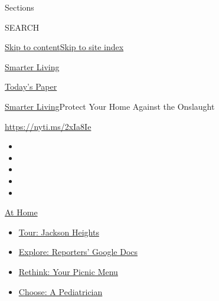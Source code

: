 Sections

SEARCH

\protect\hyperlink{site-content}{Skip to
content}\protect\hyperlink{site-index}{Skip to site index}

\href{https://www.nytimes3xbfgragh.onion/section/smarter-living}{Smarter
Living}

\href{https://myaccount.nytimes3xbfgragh.onion/auth/login?response_type=cookie\&client_id=vi}{}

\href{https://www.nytimes3xbfgragh.onion/section/todayspaper}{Today's
Paper}

\href{/section/smarter-living}{Smarter Living}\textbar{}Protect Your
Home Against the Onslaught

\url{https://nyti.ms/2xIa8Ie}

\begin{itemize}
\item
\item
\item
\item
\item
\end{itemize}

\href{https://www.nytimes3xbfgragh.onion/spotlight/at-home?action=click\&pgtype=Article\&state=default\&region=TOP_BANNER\&context=at_home_menu}{At
Home}

\begin{itemize}
\tightlist
\item
  \href{https://www.nytimes3xbfgragh.onion/interactive/2020/08/27/arts/design/jackson-heights-queens-virtual-walk-tour.html?action=click\&pgtype=Article\&state=default\&region=TOP_BANNER\&context=at_home_menu}{Tour:
  Jackson Heights}
\item
  \href{https://www.nytimes3xbfgragh.onion/interactive/2020/at-home/even-more-reporters-editors-diaries-lists-recommendations.html?action=click\&pgtype=Article\&state=default\&region=TOP_BANNER\&context=at_home_menu}{Explore:
  Reporters' Google Docs}
\item
  \href{https://www.nytimes3xbfgragh.onion/2020/08/31/dining/hand-held-picnic-food.html?action=click\&pgtype=Article\&state=default\&region=TOP_BANNER\&context=at_home_menu}{Rethink:
  Your Picnic Menu}
\item
  \href{https://www.nytimes3xbfgragh.onion/article/choosing-a-pediatrician-children.html?action=click\&pgtype=Article\&state=default\&region=TOP_BANNER\&context=at_home_menu}{Choose:
  A Pediatrician}
\end{itemize}


